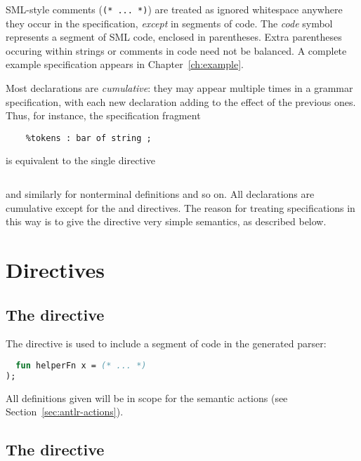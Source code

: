 SML-style comments (\texttt{(* ... *)}) are treated as ignored whitespace anywhere they occur in the specification, \emph{except} in segments of code.  The \textit{code} symbol represents a segment of SML code, enclosed in parentheses.  Extra parentheses occuring within strings or comments in code need not be balanced.
A complete example specification appears in Chapter~\ref{ch:example}.

Most \antlr{} declarations are \emph{cumulative}: they may appear multiple times in a grammar specification, with each new declaration adding to the effect of the previous ones.  Thus, for instance, the specification fragment
\begin{lstlisting}[language=MLAntlr]
    %tokens : foo ;
    %tokens : bar of string ;
\end{lstlisting}%
is equivalent to the single directive
\begin{lstlisting}[language=MLAntlr]
    %tokens : foo | bar of string ;
\end{lstlisting}%
and similarly for nonterminal definitions and so on.  All declarations are cumulative except for the  and  directives.
The reason for treating specifications in this way is to give the  directive very simple semantics, as described below.

\section{Directives}

\subsection{The  directive}

The  directive is used to include a segment of code in the generated parser:  
\begin{lstlisting}[language=SML]
%defs (
  fun helperFn x = (* ... *)
);
\end{lstlisting}%
All definitions given will be in scope for the semantic actions (see Section~\ref{sec:antlr-actions}).

\subsection{The  directive}

